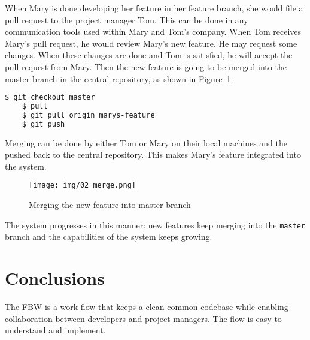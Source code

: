 \documentclass{article}
\begin{document}
When Mary is done developing her feature in her feature branch, she would file
a pull request to the project manager Tom. This can be done in any
communication tools used within Mary and Tom's company. When Tom receives
Mary's pull request, he would review Mary's new feature. He may request some
changes. When these changes are done and Tom is satisfied, he will accept the
pull request from Mary. Then the new feature is going to be merged into the
master branch in the central repository, as shown in Figure~\ref{fig.02_merge}.

\begin{lstlisting}[language=bash]
	$ git checkout master
	$ pull
	$ git pull origin marys-feature
	$ git push
\end{lstlisting}

Merging can be done by either Tom or Mary on their local machines and the pushed back to the central repository. This makes Mary's feature integrated into the system.

\begin{figure}
	\texttt{[image: img/02\_merge.png]}
	\caption{Merging the new feature into master branch}
	\label{fig.02_merge}
\end{figure}

The system progresses in this manner: new features keep merging into the \texttt{master} branch and the capabilities of the system keeps growing. 

\section{Conclusions}
The FBW is a work flow that keeps a clean common codebase while enabling collaboration between developers and project managers. The flow is easy to understand and implement. 
\end{document}
